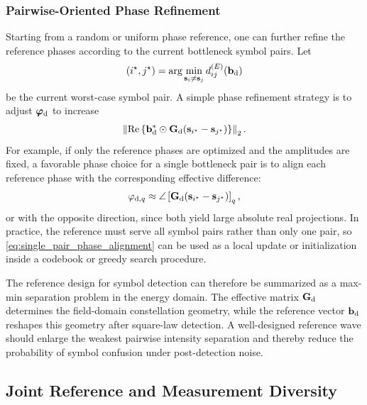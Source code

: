 \documentclass[journal]{IEEEtran}
\begin{document}
\subsubsection{Pairwise-Oriented Phase Refinement}

Starting from a random or uniform phase reference, one can further refine the reference phases according to the current bottleneck symbol pairs. 
Let
\begin{equation}
(i^\star,j^\star)
=
\arg\min_{\mathbf{s}_i\neq\mathbf{s}_j}
d_{ij}^{(E)}(\mathbf{b}_{\rm d})
\label{eq:bottleneck_pair}
\end{equation}
be the current worst-case symbol pair. 
A simple phase refinement strategy is to adjust $\boldsymbol{\varphi}_{\rm d}$ to increase
\begin{equation}
\left\|
\operatorname{Re}
\left\{
\mathbf{b}_{\rm d}^*
\odot
\mathbf{G}_{\rm d}
(\mathbf{s}_{i^\star}-\mathbf{s}_{j^\star})
\right\}
\right\|_2.
\label{eq:bottleneck_projection}
\end{equation}
For example, if only the reference phases are optimized and the amplitudes are fixed, a favorable phase choice for a single bottleneck pair is to align each reference phase with the corresponding effective difference:
\begin{equation}
\varphi_{{\rm d},q}
\approx
\angle
\left[
\mathbf{G}_{\rm d}
(\mathbf{s}_{i^\star}-\mathbf{s}_{j^\star})
\right]_q,
\label{eq:single_pair_phase_alignment}
\end{equation}
or with the opposite direction, since both yield large absolute real projections. 
In practice, the reference must serve all symbol pairs rather than only one pair, so \eqref{eq:single_pair_phase_alignment} can be used as a local update or initialization inside a codebook or greedy search procedure.

The reference design for symbol detection can therefore be summarized as a max-min separation problem in the energy domain. 
The effective matrix $\mathbf{G}_{\rm d}$ determines the field-domain constellation geometry, while the reference vector $\mathbf{b}_{\rm d}$ reshapes this geometry after square-law detection. 
A well-designed reference wave should enlarge the weakest pairwise intensity separation and thereby reduce the probability of symbol confusion under post-detection noise.

\subsection{Joint Reference and Measurement Diversity}
\end{document}

